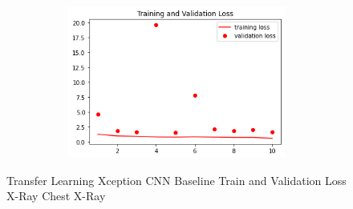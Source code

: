  \begin{figure}[H]
    \centering
    \includegraphics[width=1\textwidth,height=5cm,keepaspectratio]{Images/XceptionBaselineTrainingValidationLossChestX-Ray.png}\\
    \caption{Transfer Learning Xception CNN Baseline Train and Validation Loss X-Ray Chest X-Ray}
    \label{fig:Xception CNN Baseline Train and Validation Loss Chest X-Ray}
\end{figure}
